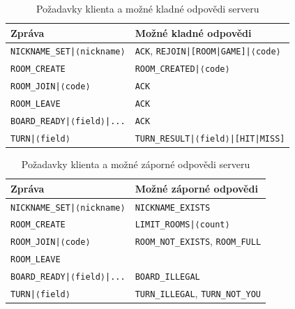 \documentclass[a4paper, 12pt]{report}
\begin{document}
\begin{table}[]
\begin{center}
\caption{\label{tab:client-requests-success}Požadavky klienta a možné kladné odpovědi serveru}
\begin{tabular}{|l|l|}
\hline
\textbf{Zpráva}                           & \textbf{Možné kladné odpovědi}\\ \hline
\texttt{NICKNAME\_SET|⟨nickname⟩}         & \texttt{ACK}, \texttt{REJOIN|{[}ROOM|GAME{]}|⟨code⟩}\\ \hline
\texttt{ROOM\_CREATE}                     & \texttt{ROOM\_CREATED|⟨code⟩}\\ \hline
\texttt{ROOM\_JOIN|⟨code⟩}                & \texttt{ACK}\\ \hline
\texttt{ROOM\_LEAVE}                      & \texttt{ACK}\\ \hline
\texttt{BOARD\_READY|⟨field⟩|...} & \texttt{ACK}\\ \hline
\texttt{TURN|⟨field⟩}                     & \texttt{TURN\_RESULT|⟨field⟩|{[}HIT|MISS{]}}\\ \hline
\end{tabular}
\end{center}
\end{table}

\begin{table}[]
\begin{center}
\caption{\label{tab:client-requests-error}Požadavky klienta a možné záporné odpovědi serveru}
\begin{tabular}{|l|l|}
\hline
\textbf{Zpráva}                           & \textbf{Možné záporné odpovědi} \\ \hline
\texttt{NICKNAME\_SET|⟨nickname⟩}         & \texttt{NICKNAME\_EXISTS}        \\ \hline
\texttt{ROOM\_CREATE}                     & \texttt{LIMIT\_ROOMS|⟨count⟩}            \\ \hline
\texttt{ROOM\_JOIN|⟨code⟩}                & \texttt{ROOM\_NOT\_EXISTS}, \texttt{ROOM\_FULL}   \\ \hline
\texttt{ROOM\_LEAVE}                      &                                 \\ \hline
\texttt{BOARD\_READY|⟨field⟩|...} & \texttt{BOARD\_ILLEGAL}                  \\ \hline
\texttt{TURN|⟨field⟩}                     & \texttt{TURN\_ILLEGAL}, \texttt{TURN\_NOT\_YOU}   \\ \hline
\end{tabular}
\end{center}
\end{table}
\end{document}
